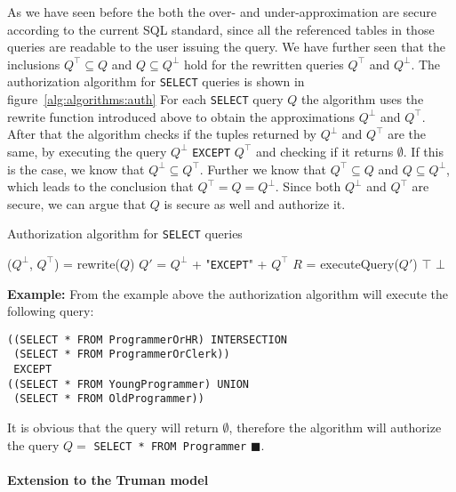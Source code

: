As we have seen before the both the over- and under-approximation are secure according to the current SQL standard, since all the referenced tables in those queries are readable to the user issuing the query.
%
We have further seen that the inclusions $Q^\top \subseteq Q$ and $Q \subseteq Q^\bot$ hold for the rewritten queries $Q^\top$ and $Q^\bot$.
%
The authorization algorithm for \texttt{SELECT} queries is shown in figure~\ref{alg:algorithms:auth}
%
For each \texttt{SELECT} query $Q$ the algorithm uses the rewrite function introduced above to obtain the approximations $Q^\bot$ and $Q^\top$.
%
After that the algorithm checks if the tuples returned by $Q^\bot$ and $Q^\top$ are the same, by executing the query  $Q^\bot$ \texttt{EXCEPT} $Q^\top$ and checking if it returns $\emptyset$.
%
If this is the case, we know that $Q^\bot \subseteq Q^\top$.
%
Further we know that $Q^\top \subseteq Q$ and $Q \subseteq Q^\bot$, which leads to the conclusion that $Q^\top = Q = Q^\bot$.
%
Since both $Q^\bot$ and $Q^\top$ are secure, we can argue that $Q$ is secure as well and authorize it.
%
\begin{algorithm}
\caption{Authorization algorithm for \texttt{SELECT} queries}
\label{alg:algorithms:auth}
	\SetAlgoLined
	($Q^\bot$, $Q^\top$) = rewrite($Q$)\;
	$Q'$ = $Q^\bot$ + "\texttt{EXCEPT}" + $Q^\top$\;
	$R$ = executeQuery($Q'$)\;
		{\Return $\top$ \;}
		{\Return $\bot$ \;}
\end{algorithm}

\smallskip
\noindent
{\bf Example:}
From the example above the authorization algorithm will execute the following query:
\begin{verbatim}
((SELECT * FROM ProgrammerOrHR) INTERSECTION
 (SELECT * FROM ProgrammerOrClerk))
 EXCEPT
((SELECT * FROM YoungProgrammer) UNION
 (SELECT * FROM OldProgrammer))
\end{verbatim}
\noindent
It is obvious that the query will return $\emptyset$, therefore the algorithm will authorize the query $Q = $ \texttt{SELECT * FROM Programmer} $\blacksquare$.

\paragraph{Extension to the Truman model}

